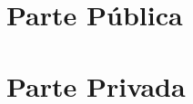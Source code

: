 \documentclass[letterpaper,12pt]{book} %
\begin{document}

\tableofcontents %
\listoffigures   %
\cleardoublepage
\listoftables    %
\cleardoublepage


%
\setcounter{page}{1} %
\part{Parte P\'ublica}            %
\part{Parte Privada}              %
%
%
%
%
%
\end{document}
